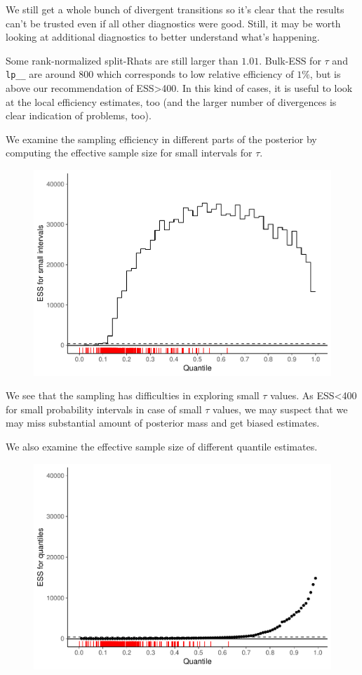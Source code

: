 \documentclass[american,]{article}
\begin{document}
We still get a whole bunch of divergent transitions so it's clear that
the results can't be trusted even if all other diagnostics were good.
Still, it may be worth looking at additional diagnostics to better
understand what's happening.

Some rank-normalized split-Rhats are still larger than \(1.01\).
Bulk-ESS for $\tau$ and \texttt{lp\_\_} are around 800 which
corresponds to low relative efficiency of \(1\%\), but is above our
recommendation of ESS\textgreater{}400. In this kind of cases, it is
useful to look at the local efficiency estimates, too (and the larger
number of divergences is clear indication of problems, too).

We examine the sampling efficiency in different parts of the posterior
by computing the effective sample size for small intervals for
$\tau$.

\begin{figure}[tp]
  \centering
  \includegraphics[width=0.6\linewidth]{graphics/local-ess-fit-cp2-tau-1.pdf}
\end{figure}

We see that the sampling has difficulties in exploring small
$\tau$ values. As ESS\textless{}400 for small probability
intervals in case of small $\tau$ values, we may suspect that we
may miss substantial amount of posterior mass and get biased estimates.

We also examine the effective sample size of different quantile
estimates.

\begin{figure}[tp]
  \centering
  \includegraphics[width=0.6\linewidth]{graphics/quantile-ess-fit-cp2-tau-1.pdf}
\end{figure}
\end{document}
